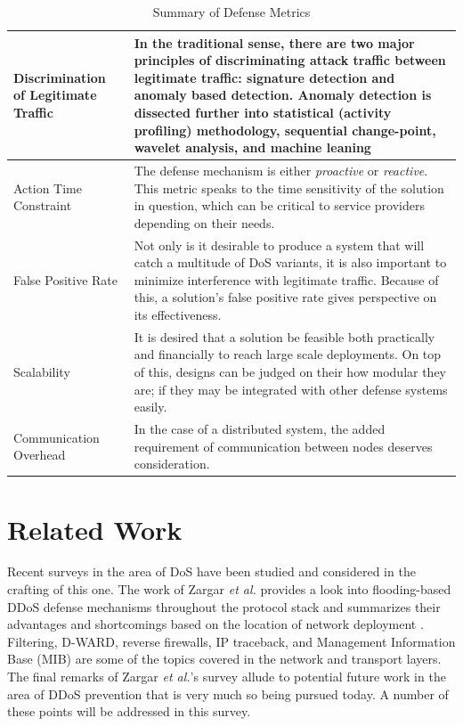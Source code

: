 \documentclass[conference]{IEEEtran}
\begin{document}
{
\tabulinesep=1mm
\begin{table}[!htb]
  \centering
  \begin{tabu} to 0.5\textwidth {|X[1,r]|X[4]|}
     \hline
      Discrimination of Legitimate Traffic & In the traditional sense, there are two major principles of discriminating attack traffic between legitimate traffic: signature detection and anomaly based detection. Anomaly detection is dissected further into statistical (activity profiling) methodology, sequential change-point, wavelet analysis, and machine leaning \cite{Filtration:Kalkan}\\\hline
      
      Action Time Constraint & The defense mechanism is either \textit{proactive} or \textit{reactive}. This metric speaks to the time sensitivity of the solution in question, which can be critical to service providers depending on their needs.\\\hline
      
      False Positive Rate & Not only is it desirable to produce a system that will catch a multitude of DoS variants, it is also important to minimize interference with legitimate traffic. Because of this, a solution's false positive rate gives perspective on its effectiveness.\\\hline
      
      Scalability & It is desired that a solution be feasible both practically and financially to reach large scale deployments. On top of this, designs can be judged on their how modular they are; if they may be integrated with other defense systems easily.\\\hline
      
      Communication Overhead & In the case of a distributed system, the added requirement of communication between nodes deserves consideration.\\\hline
  \end{tabu}
  \smallskip
  \caption{Summary of Defense Metrics}
  \label{tab:defMet}
\end{table}
}

\section{Related Work}
Recent surveys in the area of DoS have been studied and considered in the crafting of this one. The work of Zargar \textit{et al.} provides a look into flooding-based DDoS defense mechanisms throughout the protocol stack and summarizes their advantages and shortcomings based on the location of network deployment \cite{Zargar:DDOSFlood}. Filtering,  D-WARD, reverse firewalls, IP traceback, and Management Information Base (MIB) are some of the topics covered in the network and transport layers. The final remarks of Zargar \textit{et al.}'s survey allude to potential future work in the area of DDoS prevention that is very much so being pursued today. A number of these points will be addressed in this survey.
\end{document}
